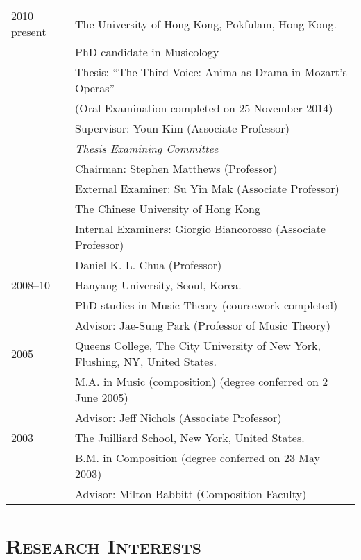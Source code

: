 \documentclass[letter,11pt,draft]{article}
\begin{document}
  \hspace*{-0.25cm}
  \begin{tabular}{p{2.5cm} l}
    2010--present & The University of Hong Kong, Pokfulam, Hong Kong.\\
    & PhD candidate in Musicology\\
    & Thesis: ``The Third Voice: Anima as Drama in Mozart's Operas''\\
    & (Oral Examination completed on 25 November 2014)\\
    & Supervisor: Youn Kim (Associate Professor)\\[2mm]
    & \textit{Thesis Examining Committee}\\
    & Chairman: Stephen Matthews (Professor)\\
    & External Examiner: Su Yin Mak (Associate Professor)\\
    & \hspace*{28.5mm} The Chinese University of Hong Kong\\
    & Internal Examiners: Giorgio Biancorosso (Associate Professor)\\
    & \hspace*{29.5mm} Daniel K. L. Chua (Professor)\\[2mm]
    
    2008--10 & Hanyang University, Seoul, Korea.\\
    & PhD studies in Music Theory (coursework completed)\\
		& Advisor: Jae-Sung Park (Professor of Music Theory)\\[2mm]
		
		2005 & Queens College, The City University of New York, Flushing, NY, United States.\\
		& M.A. in Music (composition) (degree conferred on 2 June 2005)\\
		& Advisor: Jeff Nichols (Associate Professor)\\[2mm]

    2003 & The Juilliard School, New York, United States.\\
		& B.M. in Composition (degree conferred on 23 May 2003)\\
		& Advisor: Milton Babbitt (Composition Faculty)
  \end{tabular}
  
  \vspace{2.5mm}
  
  \section*{\textsc{Research Interests}}
  
\end{document}
